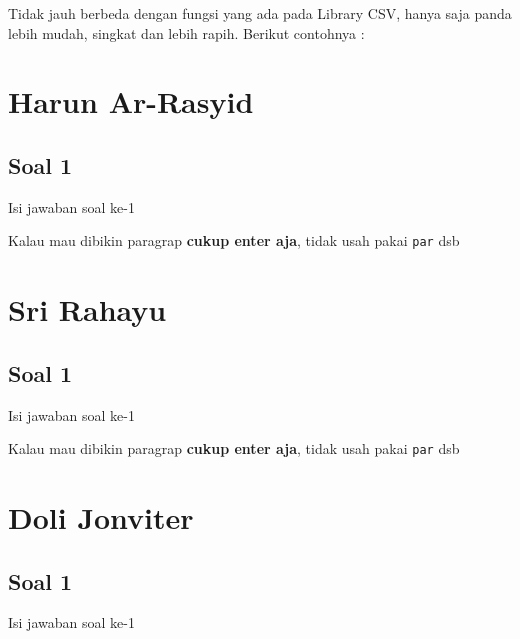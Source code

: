 Tidak jauh berbeda dengan fungsi yang ada pada Library CSV, hanya saja panda lebih mudah, singkat dan lebih rapih. Berikut contohnya :




\section{Harun Ar-Rasyid}
\subsection{Soal 1}
Isi jawaban soal ke-1

Kalau mau dibikin paragrap \textbf{cukup enter aja}, tidak usah pakai \verb|par| dsb



\section{Sri Rahayu}
\subsection{Soal 1}
Isi jawaban soal ke-1

Kalau mau dibikin paragrap \textbf{cukup enter aja}, tidak usah pakai \verb|par| dsb



\section{Doli Jonviter}
\subsection{Soal 1}
Isi jawaban soal ke-1

